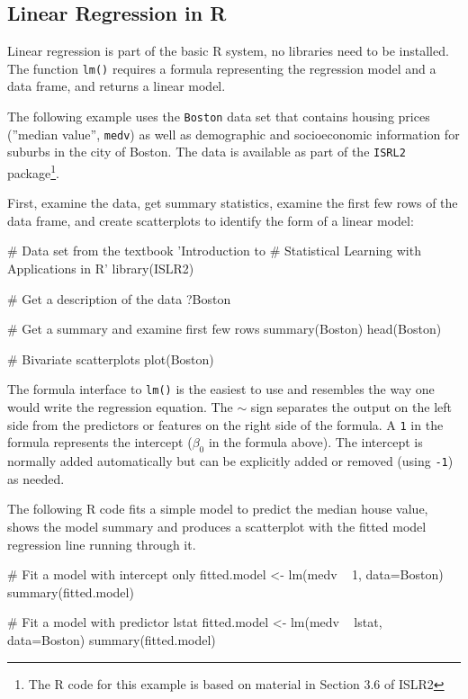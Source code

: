 \FloatBarrier
\begin{withcode}
\section{Linear Regression in R}

Linear regression is part of the basic R system, no libraries need to be installed. The function \texttt{lm()} requires a formula representing the regression model and a data frame, and returns a linear model. 

The following example uses the \texttt{Boston} data set that contains housing prices (''median value'', \texttt{medv}) as well as demographic and socioeconomic information for suburbs in the city of Boston. The data is available as part of the \texttt{ISRL2} package\footnote{The R code for this example is based on material in Section 3.6 of ISLR2}.

First, examine the data, get summary statistics, examine the first few rows of the data frame, and create scatterplots to identify the form of a linear model:

\begin{Rcode}
# Data set from the textbook 'Introduction to 
# Statistical Learning with Applications in R'
library(ISLR2)

# Get a description of the data
?Boston

# Get a summary and examine first few rows
summary(Boston)
head(Boston)

# Bivariate scatterplots
plot(Boston)
\end{Rcode}

The formula interface to \texttt{lm()} is the easiest to use and resembles the way one would write the regression equation. The $\sim$ sign separates the output on the left side from the predictors or features on the right side of the formula. A \texttt{1} in the formula represents the intercept ($\beta_0$ in the formula above). The intercept is normally added automatically but can be explicitly added or removed (using \texttt{-1}) as needed. 

The following R code fits a simple model to predict the median house value, shows the model summary and produces a scatterplot with the fitted model regression line running through it. 

\begin{Rcode}
# Fit a model with intercept only
fitted.model <- lm(medv ~ 1, data=Boston)
summary(fitted.model)

# Fit a model with predictor lstat
fitted.model <- lm(medv ~ lstat, data=Boston)
summary(fitted.model)


\end{Rcode}
\end{withcode}
